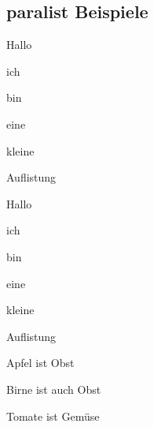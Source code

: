 \documentclass[12pt,ngerman,parskip=half]{scrartcl}
\begin{document}
\subsection{paralist Beispiele}

\begin{compactitem}
	\item Hallo
	\item ich 
	\item bin 
	\item eine 
	\item kleine 
	\item Auflistung
\end{compactitem}

\begin{compactenum}
	\item Hallo
	\item ich 
	\item bin 
	\item eine 
	\item kleine 
	\item Auflistung
\end{compactenum}

\begin{compactdesc}
\item[Apfel] ist Obst
\item[Birne] ist auch Obst
\item[Tomate] ist Gemüse
\end{compactdesc}
\end{document}
